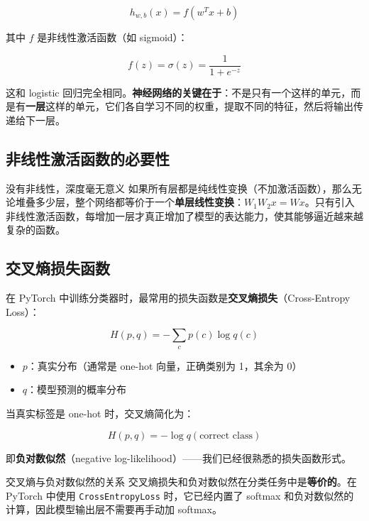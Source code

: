 \documentclass[a4paper]{article}
\begin{document}
$$h_{w,b}(x) = f(w^T x + b)$$

其中 $f$ 是非线性激活函数（如 sigmoid）：

$$f(z) = \sigma(z) = \frac{1}{1 + e^{-z}}$$

这和 logistic 回归完全相同。\textbf{神经网络的关键在于}：不是只有一个这样的单元，而是有\textbf{一层}这样的单元，它们各自学习不同的权重，提取不同的特征，然后将输出传递给下一层。

\subsection{非线性激活函数的必要性}





\begin{warningbox}{没有非线性，深度毫无意义}
如果所有层都是纯线性变换（不加激活函数），那么无论堆叠多少层，整个网络都等价于一个\textbf{单层线性变换}：$W_1 W_2 x = Wx$。只有引入非线性激活函数，每增加一层才真正增加了模型的表达能力，使其能够逼近越来越复杂的函数。
\end{warningbox}

\subsection{交叉熵损失函数}

在 PyTorch 中训练分类器时，最常用的损失函数是\textbf{交叉熵损失}（Cross-Entropy Loss）：

$$H(p, q) = -\sum_c p(c) \log q(c)$$

\begin{itemize}
    \item $p$：真实分布（通常是 one-hot 向量，正确类别为 1，其余为 0）
    \item $q$：模型预测的概率分布
\end{itemize}

当真实标签是 one-hot 时，交叉熵简化为：

$$H(p, q) = -\log q(\text{correct class})$$

即\textbf{负对数似然}（negative log-likelihood）——我们已经很熟悉的损失函数形式。

\begin{knowledgebox}{交叉熵与负对数似然的关系}
交叉熵损失和负对数似然在分类任务中是\textbf{等价的}。在 PyTorch 中使用 \texttt{CrossEntropyLoss} 时，它已经内置了 softmax 和负对数似然的计算，因此模型输出层不需要再手动加 softmax。
\end{knowledgebox}
\end{document}
